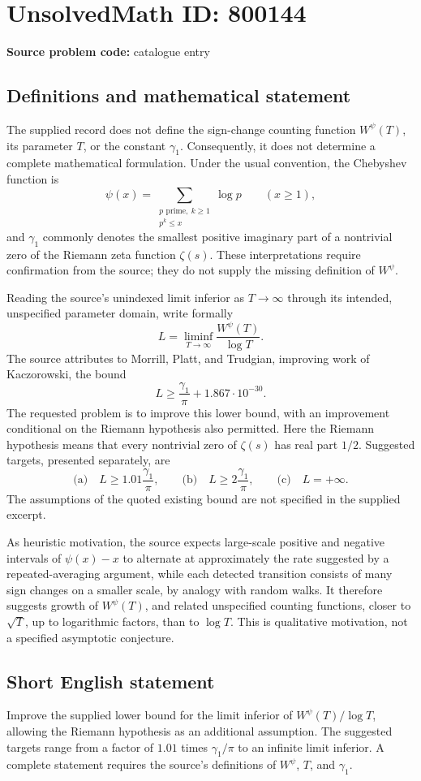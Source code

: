 \documentclass[11pt]{article}
\begin{document}
\section*{UnsolvedMath ID: 800144}
\textbf{Source problem code:} catalogue entry
\subsection{Definitions and mathematical statement}
The supplied record does not define the sign-change counting function \(W^\psi(T)\), its parameter \(T\), or the constant \(\gamma_1\). Consequently, it does not determine a complete mathematical formulation. Under the usual convention, the Chebyshev function is
\[
\psi(x)=\sum_{\substack{p\text{ prime},\ k\geq 1\\p^k\leq x}}\log p\qquad(x\geq 1),
\]
and \(\gamma_1\) commonly denotes the smallest positive imaginary part of a nontrivial zero of the Riemann zeta function \(\zeta(s)\). These interpretations require confirmation from the source; they do not supply the missing definition of \(W^\psi\).

Reading the source's unindexed limit inferior as \(T\to\infty\) through its intended, unspecified parameter domain, write formally
\[
L=\liminf_{T\to\infty}\frac{W^\psi(T)}{\log T}.
\]
The source attributes to Morrill, Platt, and Trudgian, improving work of Kaczorowski, the bound
\[
L\geq\frac{\gamma_1}{\pi}+1.867\cdot10^{-30}.
\]
The requested problem is to improve this lower bound, with an improvement conditional on the Riemann hypothesis also permitted. Here the Riemann hypothesis means that every nontrivial zero of \(\zeta(s)\) has real part \(1/2\). Suggested targets, presented separately, are
\[
\text{(a)}\quad L\geq1.01\frac{\gamma_1}{\pi},\qquad
\text{(b)}\quad L\geq2\frac{\gamma_1}{\pi},\qquad
\text{(c)}\quad L=+\infty.
\]
The assumptions of the quoted existing bound are not specified in the supplied excerpt.

As heuristic motivation, the source expects large-scale positive and negative intervals of \(\psi(x)-x\) to alternate at approximately the rate suggested by a repeated-averaging argument, while each detected transition consists of many sign changes on a smaller scale, by analogy with random walks. It therefore suggests growth of \(W^\psi(T)\), and related unspecified counting functions, closer to \(\sqrt T\), up to logarithmic factors, than to \(\log T\). This is qualitative motivation, not a specified asymptotic conjecture.
\subsection{Short English statement}
Improve the supplied lower bound for the limit inferior of \(W^\psi(T)/\log T\), allowing the Riemann hypothesis as an additional assumption. The suggested targets range from a factor of \(1.01\) times \(\gamma_1/\pi\) to an infinite limit inferior. A complete statement requires the source's definitions of \(W^\psi\), \(T\), and \(\gamma_1\).
\end{document}
